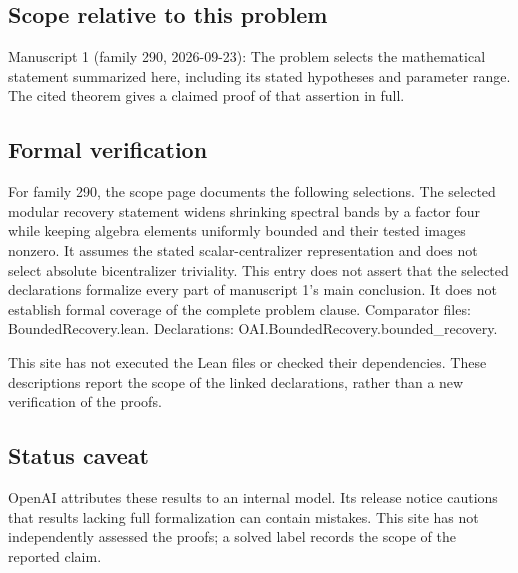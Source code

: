 \documentclass[11pt]{article}
\begin{document}
\subsection{Scope relative to this problem}
Manuscript 1 (family 290, 2026-09-23): The problem selects the mathematical statement summarized here, including its stated hypotheses and parameter range. The cited theorem gives a claimed proof of that assertion in full.

\subsection{Formal verification}
For family 290, the scope page documents the following selections. The selected modular recovery statement widens shrinking spectral bands by a factor four while keeping algebra elements uniformly bounded and their tested images nonzero. It assumes the stated scalar-centralizer representation and does not select absolute bicentralizer triviality. This entry does not assert that the selected declarations formalize every part of manuscript 1's main conclusion. It does not establish formal coverage of the complete problem clause. Comparator files: BoundedRecovery.lean. Declarations: OAI.BoundedRecovery.bounded\_recovery.

This site has not executed the Lean files or checked their dependencies. These descriptions report the scope of the linked declarations, rather than a new verification of the proofs.

\subsection{Status caveat}
OpenAI attributes these results to an internal model. Its release notice cautions that results lacking full formalization can contain mistakes. This site has not independently assessed the proofs; a solved label records the scope of the reported claim.
\end{document}
